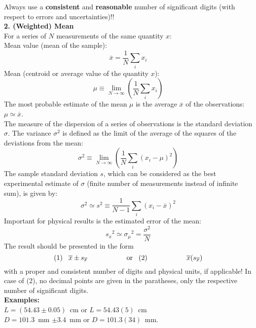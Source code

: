 \documentclass[12pt]{article}
\begin{document}
{\large Always use a {\bf consistent} and {\bf reasonable} number of
significant digits (with respect to errors and uncertainties)!!}\\

{\large\bf 2. (Weighted) Mean}\\
For a series of $N$ measurements of the same quantity $x$:\\
Mean value (mean of the sample):\\
\begin{displaymath}
\overline{x}=\frac{1}{N}\sum_i{x_i}
\end{displaymath}
Mean (centroid or average value of the quantity $x$):\\
\begin{displaymath}
\mu\equiv \lim_{N \rightarrow \infty}\left(\frac{1}{N}\sum_i{x_i}\right)
\end{displaymath}
The most probable estimate of the mean $\mu$ is the average $\overline{x}$
of the observations: $\mu\simeq\overline{x}$.\\

\pagebreak
The measure of the dispersion of a series of observations is the
standard deviation $\sigma$. The variance $\sigma^2$ is defined as the
limit of the average of the squares of the deviations from the mean:\\
\begin{displaymath}
\sigma^2\equiv \lim_{N \rightarrow
  \infty}\left(\frac{1}{N}\sum_i{(x_i-\mu)^2}\right)
\end{displaymath}
The sample standard deviation $s$, which can be considered as the
best experimental estimate of $\sigma$ (finite number of measurements
instead of infinite sum), is given by:\\
\begin{displaymath}
\sigma^2\simeq s^2\equiv\frac{1}{N-1}\sum_i{(x_i-\overline{x})^2}
\end{displaymath}
Important for physical results is the estimated error of the mean:
\begin{displaymath}
{s_{\overline{x}}}^2\simeq {\sigma_\mu}^2=\frac{\sigma^2}{N}
\end{displaymath}
The result should be presented in the form
\begin{displaymath}
(1)\hspace*{3mm}
\overline{x}\pm s_{\overline{x}} \hspace*{2cm}\mbox{or}\hspace*{3mm}
(2)\hspace*{2cm}\overline{x}(s_{\overline{x}})
\end{displaymath}
with a proper and consistent number of digits and physical units, if
applicable! In case of (2), no decimal points are given in the paratheses,
only the respective number of significant digits.\\
{\bf Examples:} \\
$L=(54.43\pm 0.05)$~cm or $L=54.43(5)$~cm\\
$D=101.3$~mm $\pm 3.4$~mm or $D=101.3(34)$~mm.\\
\end{document}
